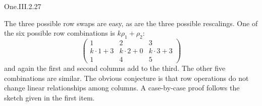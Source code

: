 \begin{ans}{One.III.2.27}
      \begin{exparts}
        \partsitem The three possible row swaps are easy,
          as are the three possible rescalings.
          One of the six possible row combinations is \( k\rho_1+\rho_2 \):
          \begin{equation*}
            \begin{pmatrix}
              1           &2           &3  \\
              k\cdot 1+3  &k\cdot 2+0  &k\cdot 3+3  \\
              1           &4           &5
            \end{pmatrix}
          \end{equation*}
          and again the first and second columns add to the third.
          The other five combinations are similar.
        \partsitem The obvious conjecture is that row operations do not change
          linear relationships among columns.
        \partsitem A case-by-case
          proof follows the sketch given in the first item.
      \end{exparts}
   
\end{ans}

